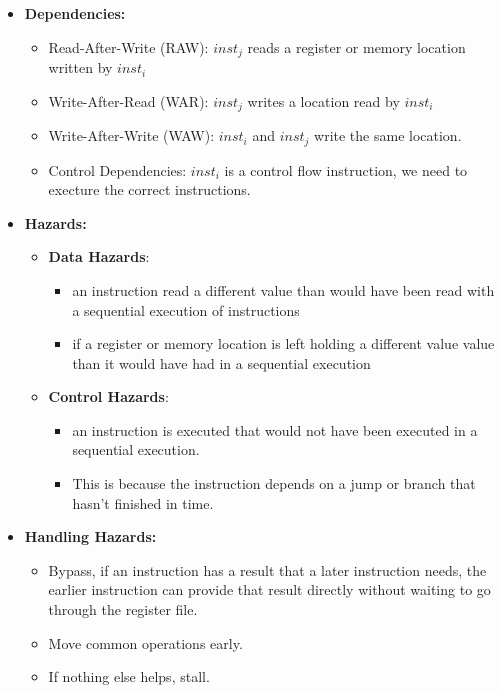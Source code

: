 \documentclass[../main.tex]{subfiles}
\begin{document}
\begin{itemize}
	\item \textbf{Dependencies:}
	      \begin{itemize}
		      \item Read-After-Write (RAW): \(inst_j\) reads a register or memory location written by \(inst_i\)
		      \item Write-After-Read (WAR): \(inst_j\) writes a location read by \(inst_i\)
		      \item Write-After-Write (WAW): \(inst_i\) and \(inst_j\) write the same location.
		      \item Control Dependencies: \(inst_i\) is a control flow instruction, we need to execture the correct instructions.
	      \end{itemize}
	\item \textbf{Hazards:}
	      \begin{itemize}
		      \item \textbf{Data Hazards}:
		            \begin{itemize}
			            \item an instruction read a different value than would have been read with a sequential execution of instructions
			            \item if a register or memory location is left holding a different value value than it would have had in a sequential execution
		            \end{itemize}
		      \item \textbf{Control Hazards}:
		            \begin{itemize}
			            \item an instruction is executed that would not have been executed in a sequential execution.
			            \item This is because the instruction depends on a jump or branch that hasn't finished in time.
		            \end{itemize}
	      \end{itemize}
	\item \textbf{Handling Hazards:}
	      \begin{itemize}
		      \item Bypass, if an instruction has a result that a later instruction needs, the earlier instruction can provide that result directly without waiting to go through the register file.
		      \item Move common operations early.
		      \item If nothing else helps, stall.
	      \end{itemize}
\end{itemize}
\end{document}
